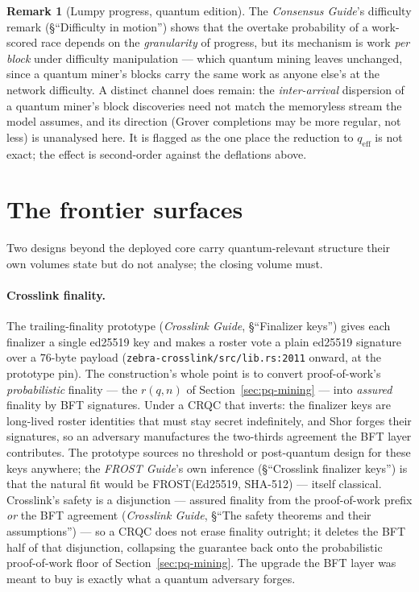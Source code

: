 \documentclass[11pt,a4paper]{article}
\theoremstyle{definition}
\newtheorem{remark}[theorem]{Remark}
\begin{document}
\begin{remark}[Lumpy progress, quantum edition]\label{rem:pq-lumpy}
The \emph{Consensus Guide}'s difficulty remark (\S``Difficulty in
motion'') shows that the overtake probability of a work-scored race
depends on the \emph{granularity} of progress, but its mechanism is
work \emph{per block} under difficulty manipulation --- which quantum
mining leaves unchanged, since a quantum miner's blocks carry the same
work as anyone else's at the network difficulty. A distinct channel
does remain: the \emph{inter-arrival} dispersion of a quantum miner's
block discoveries need not match the memoryless stream the model
assumes, and its direction (Grover completions may be more regular, not
less) is unanalysed here. It is flagged as the one place the reduction
to $q_{\mathrm{eff}}$ is not exact; the effect is second-order against
the deflations above.
\end{remark}

\section{The frontier surfaces}\label{sec:pq-frontier}

Two designs beyond the deployed core carry quantum-relevant structure
their own volumes state but do not analyse; the closing volume must.

\paragraph{Crosslink finality.} The trailing-finality prototype
(\emph{Crosslink Guide}, \S``Finalizer keys'') gives each finalizer a
single ed25519 key and makes a roster vote a plain ed25519 signature
over a $76$-byte payload (\texttt{zebra-crosslink/src/lib.rs:2011}
onward, at the prototype pin). The construction's whole point is to
convert proof-of-work's \emph{probabilistic} finality --- the $r(q, n)$
of Section~\ref{sec:pq-mining} --- into \emph{assured} finality by BFT
signatures. Under a CRQC that inverts: the finalizer keys are long-lived
roster identities that must stay secret indefinitely, and Shor forges
their signatures, so an adversary manufactures the two-thirds agreement
the BFT layer contributes. The prototype sources no threshold or
post-quantum design for these keys anywhere; the \emph{FROST Guide}'s
own inference (\S``Crosslink finalizer keys'') is that the natural
fit would be \textsf{FROST}(Ed25519, SHA-512) --- itself classical.
Crosslink's safety is a disjunction --- assured finality from the
proof-of-work prefix \emph{or} the BFT agreement (\emph{Crosslink
Guide}, \S``The safety theorems and their assumptions'') --- so a CRQC
does not erase finality outright; it deletes the BFT half of that
disjunction, collapsing the guarantee back onto the probabilistic
proof-of-work floor of Section~\ref{sec:pq-mining}. The upgrade the BFT
layer was meant to buy is exactly what a quantum adversary forges.
\end{document}
